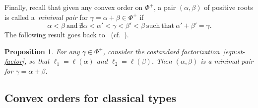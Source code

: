 \documentclass[10pt,a4paper]{amsart}
\numberwithin{equation}{section}
\newtheorem{Proposition}[Theorem]{Proposition}
 { \theoremstyle{definition}
\newtheorem{Definition}[Theorem]{Definition}
\newtheorem{Note}[Theorem]{Note}
\newtheorem{Example}[Theorem]{Example}
\newtheorem{Remark}[Theorem]{Remark} }
\begin{document}
Finally, recall that given any convex order on $\Phi^+$, a pair $(\alpha,\beta)$ of positive roots is called a~\textit{minimal pair} for $\gamma=\alpha+\beta\in \Phi^+$ if
\begin{equation}\label{eq:min_pair}
 \alpha < \beta \ \mathrm{and} \ \nexists
 \alpha < \alpha' < \gamma < \beta' < \beta \ \mathrm{such\ that} \ \alpha' + \beta' = \gamma.
\end{equation}
The following result goes back to~\cite{L, Ro} (cf.\ \cite[Proposition~2.38]{NT}).

\begin{Proposition}\label{prop:minimial-via-standard}
For any $\gamma\in \Phi^+$, consider the costandard factorization~\eqref{eqn:st-factor}, so that $\ell_1=\ell(\alpha)$ and $\ell_2=\ell(\beta)$. Then $(\alpha,\beta)$ is a minimal pair for $\gamma=\alpha+\beta$.
\end{Proposition}

\subsection{Convex orders for classical types}\label{ssec:ABCD-orders}
\end{document}
